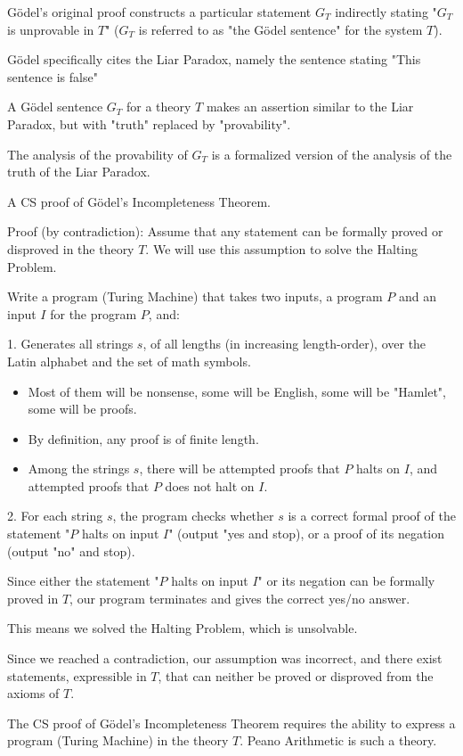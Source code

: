 \documentclass{article}
\begin{document}
Gödel's original proof constructs a particular statement $G_T$ indirectly stating "$G_T$ is unprovable in $T$" ($G_T$ is referred to as "the Gödel sentence" for the system $T$).

Gödel specifically cites the Liar Paradox, namely the sentence stating "This sentence is false"

A Gödel sentence $G_T$ for a theory $T$ makes an assertion similar to the Liar Paradox, but with "truth" replaced by "provability".

The analysis of the provability of $G_T$ is a formalized version of the analysis of the truth of the Liar Paradox.

A CS proof of Gödel's Incompleteness Theorem.

Proof (by contradiction): Assume that any statement can be formally proved or disproved in the theory $T$. We will use this assumption to solve the Halting Problem.

Write a program (Turing Machine) that takes two inputs, a program $P$ and an input $I$ for the program $P$, and:

1. Generates all strings $s$, of all lengths (in increasing length-order), over the Latin alphabet and the set of math symbols.
\begin{itemize}
    \item Most of them will be nonsense, some will be English, some will be "Hamlet", some will be proofs.
    \item By definition, any proof is of finite length.
    \item Among the strings $s$, there will be attempted proofs that $P$ halts on $I$, and attempted proofs that $P$ does not halt on $I$.
\end{itemize}

2. For each string $s$, the program checks whether $s$ is a correct formal proof of the statement "$P$ halts on input $I$" (output "yes and stop), or a proof of its negation (output "no" and stop).

Since either the statement "$P$ halts on input $I$" or its negation can be formally proved in $T$, our program terminates and gives the correct yes/no answer.

This means we solved the Halting Problem, which is unsolvable.

Since we reached a contradiction, our assumption was incorrect, and there exist statements, expressible in $T$, that can neither be proved or disproved from the axioms of $T$.

The CS proof of Gödel's Incompleteness Theorem requires the ability to express a program (Turing Machine) in the theory $T$. Peano Arithmetic is such a theory.
\end{document}
